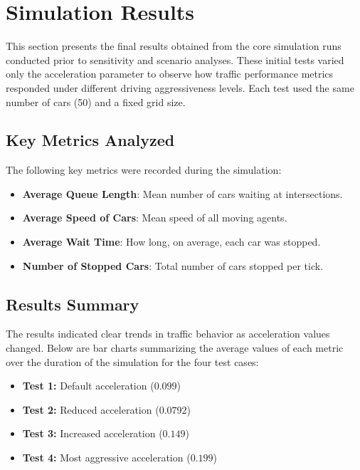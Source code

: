 \documentclass[12pt]{article}
\begin{document}
\section{Simulation Results}

This section presents the final results obtained from the core simulation runs conducted prior to sensitivity and scenario analyses. These initial tests varied only the acceleration parameter to observe how traffic performance metrics responded under different driving aggressiveness levels. Each test used the same number of cars (50) and a fixed grid size.

\subsection{Key Metrics Analyzed}

The following key metrics were recorded during the simulation:

\begin{itemize}
    \item \textbf{Average Queue Length}: Mean number of cars waiting at intersections.
    \item \textbf{Average Speed of Cars}: Mean speed of all moving agents.
    \item \textbf{Average Wait Time}: How long, on average, each car was stopped.
    \item \textbf{Number of Stopped Cars}: Total number of cars stopped per tick.
\end{itemize}

\subsection{Results Summary}

The results indicated clear trends in traffic behavior as acceleration values changed. Below are bar charts summarizing the average values of each metric over the duration of the simulation for the four test cases:

\begin{itemize}
    \item \textbf{Test 1:} Default acceleration ($0.099$)
    \item \textbf{Test 2:} Reduced acceleration ($0.0792$)
    \item \textbf{Test 3:} Increased acceleration ($0.149$)
    \item \textbf{Test 4:} Most aggressive acceleration ($0.199$)
\end{itemize}
\end{document}
